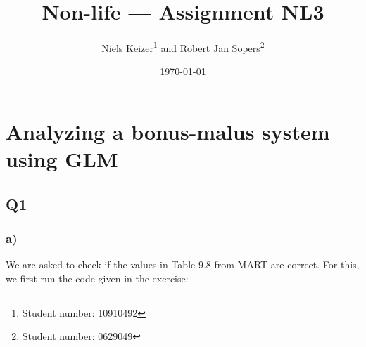 \documentclass[11pt]{article}
\title{Non-life --- Assignment NL3}  %
\author{
  Niels Keizer\footnote{Student number: 10910492}
  \quad and \quad
  Robert Jan Sopers\footnote{Student number: 0629049}
}
\date{\today}
\begin{document}
\maketitle

\section*{Analyzing a bonus-malus system using GLM}

\subsection*{Q1}

\subsubsection*{a)}
We are asked to check if the values in Table 9.8 from MART are correct. For this, we first run the code given in the exercise:
\end{document}
